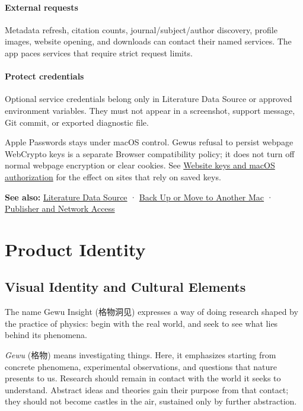 \documentclass[10pt,letterpaper,oneside]{scrreprt}
\newcommand{\GewuIdentityChapter}[1]{%
  \par\Needspace{13\baselineskip}%
  \let\GewuSavedClearPage\clearpage
  \let\GewuSavedClearDoublePage\cleardoublepage
  \let\clearpage\relax
  \let\cleardoublepage\relax
  \chapter{#1}%
  \let\clearpage\GewuSavedClearPage
  \let\cleardoublepage\GewuSavedClearDoublePage
}
\newenvironment{GewuRelated}{\par\nobreak\vspace{3pt}\nobreak\begingroup\small\sffamily\begin{samepage}\noindent}{\par\end{samepage}\endgroup}
\newenvironment{GewuLead}
  {\begin{list}{}{\leftmargin=0pt\rightmargin=0pt\topsep=0pt\partopsep=0pt\parsep=0pt}\item\relax
    \sffamily\fontsize{10.5}{13.2}\selectfont\color{GewuMuted}}
  {\end{list}}
\begin{document}
\subsection{External requests}\label{external-requests}

Metadata refresh, citation counts, journal/subject/author discovery, profile images, website opening, and downloads can contact their named services. The app paces services that require strict request limits.

\subsection{Protect credentials}\label{protect-credentials}

Optional service credentials belong only in Literature Data Source or approved environment variables. They must not appear in a screenshot, support message, Git commit, or exported diagnostic file.

Apple Passwords stays under macOS control. Gewu\textquotesingle s refusal to persist webpage WebCrypto keys is a separate Browser compatibility policy; it does not turn off normal webpage encryption or clear cookies. See \hyperref[browser-website-keys]{Website keys and macOS authorization} for the effect on sites that rely on saved keys.

\begin{GewuRelated}
\textbf{See also:} \hyperref[citation-settings]{Literature Data Source} · \hyperref[backup-migrate]{Back Up or Move to Another Mac} · \hyperref[network-access]{Publisher and Network Access}
\end{GewuRelated}

\part{Product Identity}\label{part-4}

\GewuIdentityChapter{Visual Identity and Cultural Elements}\label{visual-identity}

\begin{GewuLead}
The name Gewu Insight (格物洞见) expresses a way of doing research shaped by the practice of physics: begin with the real world, and seek to see what lies behind its phenomena.
\end{GewuLead}

\emph{Gewu} (格物) means investigating things. Here, it emphasizes starting from concrete phenomena, experimental observations, and questions that nature presents to us. Research should remain in contact with the world it seeks to understand. Abstract ideas and theories gain their purpose from that contact; they should not become castles in the air, sustained only by further abstraction.
\end{document}
